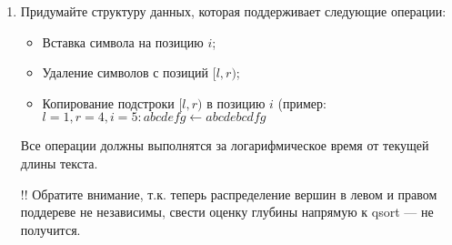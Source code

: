 \begin{enumerate}
	\item Придумайте структуру данных, которая поддерживает следующие операции:
	\begin{itemize}
		\item Вставка символа на позицию $i$;
		\item Удаление символов с позиций $[l, r)$;
		\item Копирование подстроки $[l, r)$ в позицию $i$ (пример: $l = 1, r = 4, i = 5 : abcdefg \leftarrow abcdebcdfg$
	\end{itemize}
	
	Все операции должны выполнятся за логарифмическое время от текущей длины текста.
		
	!! Обратите внимание, т.к. теперь распределение вершин в левом и правом поддереве не 
	независимы, свести оценку глубины напрямую к qsort — не получится.	
\end{enumerate}
